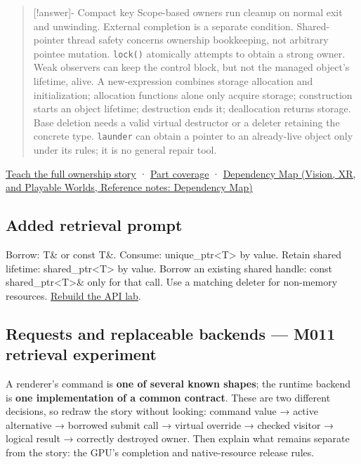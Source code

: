 \begin{quote}
{[}!answer{]}- Compact key Scope-based owners run cleanup on normal exit and unwinding. External completion is a separate condition. Shared-pointer thread safety concerns ownership bookkeeping, not arbitrary pointee mutation. \texttt{lock()} atomically attempts to obtain a strong owner. Weak observers can keep the control block, but not the managed object's lifetime, alive. A new-expression combines storage allocation and initialization; allocation functions alone only acquire storage; construction starts an object lifetime; destruction ends it; deallocation returns storage. Base deletion needs a valid virtual destructor or a deleter retaining the concrete type. \texttt{launder} can obtain a pointer to an already-live object only under its rules; it is no general repair tool.
\end{quote}

\hyperref[01-foundations-i-ch004-from-a-live-object-to-responsible-resource-ownership]{Teach the full ownership story} · \hyperref[appendix-fd090d982a15-m010---parts-148-160]{Part coverage} · \href{../07-Vision-XR-and-Playable-Worlds/main.pdf\#nameddest=appendix-4ad47bdd269a}{Dependency Map (Vision, XR, and Playable Worlds, Reference notes: Dependency Map)}

\subsection{Added retrieval prompt}\label{appendix-960160274237-added-retrieval-prompt}

Borrow: T\& or const T\&. Consume: unique\_ptr\textless T\textgreater{} by value. Retain shared lifetime: shared\_ptr\textless T\textgreater{} by value. Borrow an existing shared handle: const shared\_ptr\textless T\textgreater{}\& only for that call. Use a matching deleter for non-memory resources. \hyperref[01-foundations-i-ch003-worked-api-choice-borrow-consume-retain-or-copy-a-value]{Rebuild the API lab}.

\subsection{Requests and replaceable backends --- M011 retrieval experiment}\label{appendix-960160274237-requests-and-replaceable-backends-m011-retrieval-experiment}

A renderer's command is \textbf{one of several known shapes}; the runtime backend is \textbf{one implementation of a common contract}. These are two different decisions, so redraw the story without looking: command value → active alternative → borrowed submit call → virtual override → checked visitor → logical result → correctly destroyed owner. Then explain what remains separate from the story: the GPU's completion and native-resource release rules.

